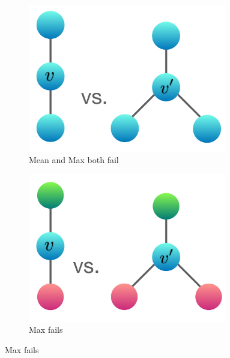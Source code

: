 \begin{figure}[t]
 \vspace{-0.05in}
    \centering
    \begin{subfigure}[b]{0.25\textwidth}
        \includegraphics[width=0.95\textwidth]{graph3_center.pdf} \vspace{-0.1in}
        \caption{Mean and Max both fail}
        \label{fig:all-same}
    \end{subfigure}   \hspace{0.1\textwidth}
    \begin{subfigure}[b]{0.25\textwidth}
        \includegraphics[width=0.95\textwidth]{graph1_center.pdf}  \vspace{-0.1in}
        \caption{Max fails}
        \label{fig:max-fail}
    \end{subfigure}   \hspace{0.1\textwidth}

\end{figure}
